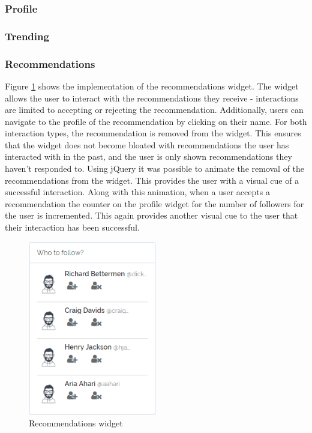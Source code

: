 \subsubsection{Profile}
\subsubsection{Trending}
\subsubsection{Recommendations}
Figure \ref{fig:RecommendationsWidget} shows the implementation of the recommendations widget. The widget allows the user to interact with the recommendations they receive - interactions are limited to accepting or rejecting the recommendation. Additionally, users can navigate to the profile of the recommendation by clicking on their name. For both interaction types, the recommendation is removed from the widget. This ensures that the widget does not become bloated with recommendations the user has interacted with in the past, and the user is only shown recommendations they haven't responded to. Using jQuery it was possible to animate the removal of the recommendations from the widget. This provides the user with a visual cue of a successful interaction. Along with this animation, when a user accepts a recommendation the counter on the profile widget for the number of followers for the user is incremented. This again provides another visual cue to the user that their  interaction has been successful.

\begin{figure}[H]
\centering
\includegraphics[height=3in]{Images/Implementation/RecommendationsWidget}
\caption{Recommendations widget}
\label{fig:RecommendationsWidget}
\end{figure}

